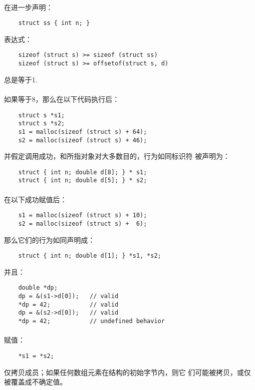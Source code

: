 \paragraph{}
在进一步声明：
\begin{lstlisting}
    struct ss { int n; }
\end{lstlisting}
表达式：
\begin{lstlisting}
    sizeof (struct s) >= sizeof (struct ss)
    sizeof (struct s) >= offsetof(struct s, d)
\end{lstlisting}
总是等于1.

\paragraph{}
如果等于8，那么在以下代码执行后：
\begin{lstlisting}
    struct s *s1;
    struct s *s2;
    s1 = malloc(sizeof (struct s) + 64);
    s2 = malloc(sizeof (struct s) + 46);
\end{lstlisting}
并假定调用成功，和所指对象对大多数目的，行为如同标识符
被声明为：
\begin{lstlisting}
    struct { int n; double d[8]; } * s1;
    struct { int n; double d[5]; } * s2;
\end{lstlisting}

\paragraph{}
在以下成功赋值后：
\begin{lstlisting}
    s1 = malloc(sizeof (struct s) + 10);
    s2 = malloc(sizeof (struct s) +  6);
\end{lstlisting}
那么它们的行为如同声明成：
\begin{lstlisting}
    struct { int n; double d[1]; } *s1, *s2;
\end{lstlisting}
并且：
\begin{lstlisting}
    double *dp;
    dp = &(s1->d[0]);   // valid
    *dp = 42;           // valid
    dp = &(s2->d[0]);   // valid
    *dp = 42;           // undefined behavior
\end{lstlisting}

\paragraph{}
赋值：
\begin{lstlisting}
    *s1 = *s2;
\end{lstlisting}
仅拷贝成员；如果任何数组元素在结构的初始字节内，则它
们可能被拷贝，或仅被覆盖成不确定值。

